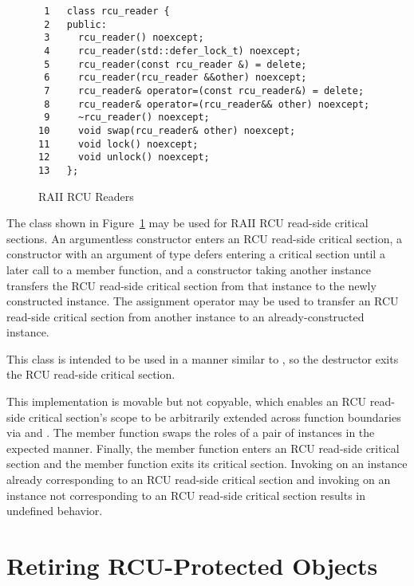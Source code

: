 \documentclass[letterpaper,10pt]{article}
\begin{document}
\begin{figure}[tbp]
{ \scriptsize
\begin{verbatim}
 1   class rcu_reader {
 2   public:
 3     rcu_reader() noexcept;
 4     rcu_reader(std::defer_lock_t) noexcept;
 5     rcu_reader(const rcu_reader &) = delete;
 6     rcu_reader(rcu_reader &&other) noexcept;
 7     rcu_reader& operator=(const rcu_reader&) = delete;
 8     rcu_reader& operator=(rcu_reader&& other) noexcept;
 9     ~rcu_reader() noexcept;
10     void swap(rcu_reader& other) noexcept;
11     void lock() noexcept;
12     void unlock() noexcept;
13   };
\end{verbatim}
}
\caption{RAII RCU Readers}
\label{fig:RAII RCU Readers}
\end{figure}

The  class shown in
Figure~\ref{fig:RAII RCU Readers}
may be used for RAII RCU read-side critical sections.
An argumentless constructor enters an RCU read-side critical section,
a constructor with an argument of type  defers
entering a critical section until a later call to a
 member function,
and a constructor taking another  instance
transfers the RCU read-side critical section from that instance
to the newly constructed instance.
The assignment operator may be used to transfer an RCU read-side critical
section from another  instance to an already-constructed
instance.

This class is intended to be used in a manner similar to ,
so the destructor exits the RCU read-side critical section.

This implementation is movable but not copyable, which enables
an RCU read-side critical section's scope to be arbitrarily
extended across function boundaries via  and
.
The  member function swaps the roles
of a pair of  instances in the expected manner.
Finally, the  member function enters an
RCU read-side critical section and the 
member function exits its critical section.
Invoking  on an instance already corresponding
to an RCU read-side critical section and invoking
 on an instance not corresponding to
an RCU read-side critical section results in undefined behavior.

\section{Retiring RCU-Protected Objects}
\label{sec:Retiring RCU-Protected Objects}
\end{document}
